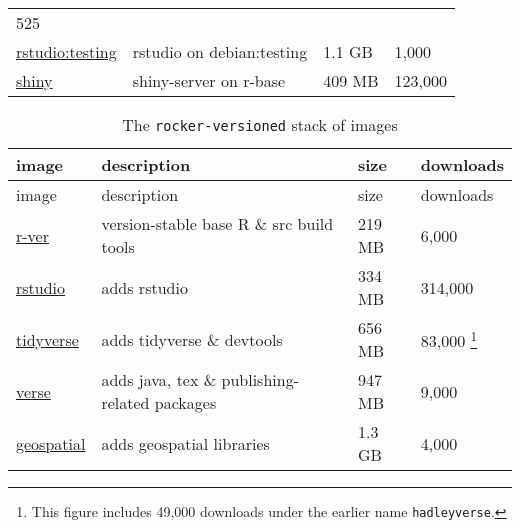 \begin{longtable}[]{@{}llll@{}}
\begin{minipage}[t]{0.10\columnwidth}
525\strut
\end{minipage}\tabularnewline
\begin{minipage}[t]{0.20\columnwidth}\raggedright\strut
\href{https://hub.docker.com/r/rocker/r-devel-san}{rstudio:testing}\strut
\end{minipage} & \begin{minipage}[t]{0.50\columnwidth}\raggedright\strut
rstudio on debian:testing\strut
\end{minipage} & \begin{minipage}[t]{0.08\columnwidth}\raggedright\strut
1.1 GB\strut
\end{minipage} & \begin{minipage}[t]{0.10\columnwidth}\raggedright\strut
1,000\strut
\end{minipage}\tabularnewline
\begin{minipage}[t]{0.20\columnwidth}\raggedright\strut
\href{https://hub.docker.com/r/rocker/shiny}{shiny}\strut
\end{minipage} & \begin{minipage}[t]{0.50\columnwidth}\raggedright\strut
shiny-server on r-base\strut
\end{minipage} & \begin{minipage}[t]{0.08\columnwidth}\raggedright\strut
409 MB\strut
\end{minipage} & \begin{minipage}[t]{0.10\columnwidth}\raggedright\strut
123,000\strut
\end{minipage}\tabularnewline
\bottomrule
\end{longtable}

\begin{longtable}[]{@{}llll@{}}
\caption{The \texttt{rocker-versioned} stack of images}\tabularnewline
\toprule
image & description & size & downloads\tabularnewline
\midrule
\endfirsthead
\toprule
image & description & size & downloads\tabularnewline
\midrule
\endhead
\href{https://hub.docker.com/r/rocker/r-ver}{r-ver} & version-stable
base R \& src build tools & 219 MB & 6,000\tabularnewline
\href{https://hub.docker.com/r/rocker/rstudio}{rstudio} & adds rstudio &
334 MB & 314,000\tabularnewline
\href{https://hub.docker.com/r/rocker/tidyverse}{tidyverse} & adds
tidyverse \& devtools & 656 MB & 83,000 \footnote{This figure includes
  49,000 downloads under the earlier name \texttt{hadleyverse}.}\tabularnewline
\href{https://hub.docker.com/r/rocker/verse}{verse} & adds java, tex \&
publishing-related packages & 947 MB & 9,000\tabularnewline
\href{https://hub.docker.com/r/rocker/geospatial}{geospatial} & adds
geospatial libraries & 1.3 GB & 4,000\tabularnewline
\bottomrule
\end{longtable}


